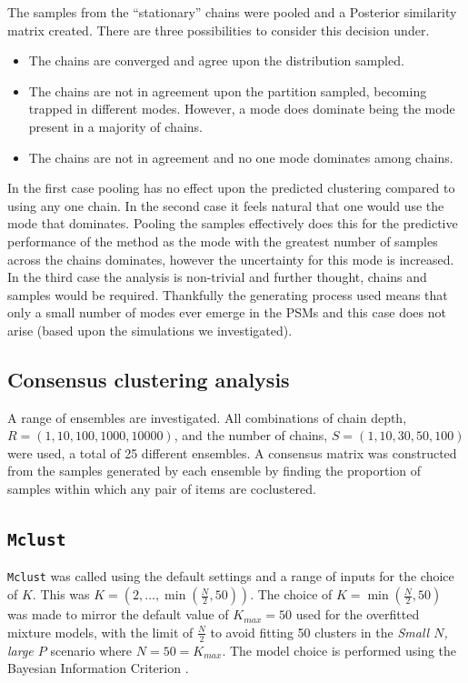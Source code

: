 \documentclass[]{article}
\begin{document}
The samples from the ``stationary'' chains were pooled and a Posterior similarity matrix created. There are three possibilities to consider this decision under.
\begin{itemize}
	\item The chains are converged and agree upon the distribution sampled.
	\item The chains are not in agreement upon the partition sampled, becoming trapped in different modes. However, a mode does dominate being the mode present in a majority of chains.
	\item The chains are not in agreement and no one mode dominates among chains.
\end{itemize}
In the first case pooling has no effect upon the predicted clustering compared to using any one chain. In the second case it feels natural that one would use the mode that dominates. Pooling the samples effectively does this for the predictive performance of the method as the mode with the greatest number of samples across the chains dominates, however the uncertainty for this mode is increased. In the third case the analysis is non-trivial and further thought, chains and samples would be required. Thankfully the generating process used means that only a small number of modes ever emerge in the PSMs and this case does not arise (based upon the simulations we investigated).

\subsection{Consensus clustering analysis} 
A range of ensembles are investigated. All combinations of chain depth, $R=(1, 10, 100, 1000, 10000)$, and the number of chains, $S=(1, 10, 30, 50, 100)$ were used, a total of 25 different ensembles. A consensus matrix was constructed from the samples generated by each ensemble by finding the proportion of samples within which any pair of items are coclustered.

\subsection{\texttt{Mclust}}
\texttt{Mclust} was called using the default settings and a range of inputs for the choice of $K$. This was $K = (2, \ldots, \min(\frac{N}{2}, 50))$. The choice of $K=\min(\frac{N}{2}, 50)$ was made to mirror the default value of $K_{max}=50$ used for the overfitted mixture models, with the limit of $\frac{N}{2}$ to avoid fitting 50 clusters in the \emph{Small $N$, large $P$} scenario where $N=50=K_{max}$. The model choice is performed using the Bayesian Information Criterion \citep[][as implemented in \texttt{Mclust}]{schwarz1978estimating}.
\end{document}
